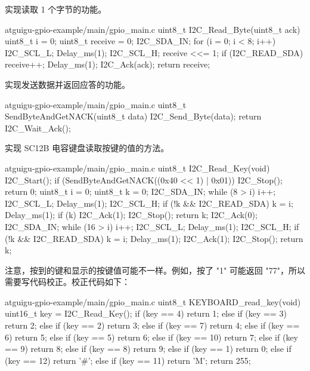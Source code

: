 \documentclass[lang=cn,newtx,10pt,scheme=chinese]{elegantbook}
\begin{document}
实现读取 1 个字节的功能。

\begin{mycode}{atguigu-gpio-example/main/gpio\_main.c}
uint8_t I2C_Read_Byte(uint8_t ack)
{
    uint8_t i = 0;
    uint8_t receive = 0;
    I2C_SDA_IN;
    for (i = 0; i < 8; i++)
    {
        I2C_SCL_L;
        Delay_ms(1);
        I2C_SCL_H;
        receive <<= 1;
        if (I2C_READ_SDA)
        {
            receive++;
        }
        Delay_ms(1);
    }
    I2C_Ack(ack);
    return receive;
}
\end{mycode}

实现发送数据并返回应答的功能。

\begin{mycode}{atguigu-gpio-example/main/gpio\_main.c}
uint8_t SendByteAndGetNACK(uint8_t data)
{
    I2C_Send_Byte(data);
    return I2C_Wait_Ack();
}
\end{mycode}

实现 SC12B 电容键盘读取按键的值的方法。

\begin{mycode}{atguigu-gpio-example/main/gpio\_main.c}
uint8_t I2C_Read_Key(void)
{
    I2C_Start();
    if (SendByteAndGetNACK((0x40 << 1) | 0x01))
    {
        I2C_Stop();
        return 0;
    }
    uint8_t i = 0;
    uint8_t k = 0;
    I2C_SDA_IN;
    while (8 > i)
    {
        i++;
        I2C_SCL_L;
        Delay_ms(1);
        I2C_SCL_H;
        if (!k && I2C_READ_SDA)
        {
            k = i;
        }
        Delay_ms(1);
    }
    if (k)
    {
        I2C_Ack(1);
        I2C_Stop();
        return k;
    }
    I2C_Ack(0);
    I2C_SDA_IN;
    while (16 > i)
    {
        i++;
        I2C_SCL_L;
        Delay_ms(1);
        I2C_SCL_H;
        if (!k && I2C_READ_SDA)
        {
            k = i;
        }
        Delay_ms(1);
    }
    I2C_Ack(1);
    I2C_Stop();
    return k;
}
\end{mycode}

注意，按到的键和显示的按键值可能不一样。例如，按了 "1" 可能返回 "77"，所以需要写代码校正。校正代码如下：

\begin{mycode}{atguigu-gpio-example/main/gpio\_main.c}
uint8_t KEYBOARD_read_key(void)
{
    uint16_t key = I2C_Read_Key();
    if (key == 4)
        return 1;
    else if (key == 3)
        return 2;
    else if (key == 2)
        return 3;
    else if (key == 7)
        return 4;
    else if (key == 6)
        return 5;
    else if (key == 5)
        return 6;
    else if (key == 10)
        return 7;
    else if (key == 9)
        return 8;
    else if (key == 8)
        return 9;
    else if (key == 1)
        return 0;
    else if (key == 12)
        return '#';
    else if (key == 11)
        return 'M';
    return 255;
}
\end{mycode}
\end{document}
